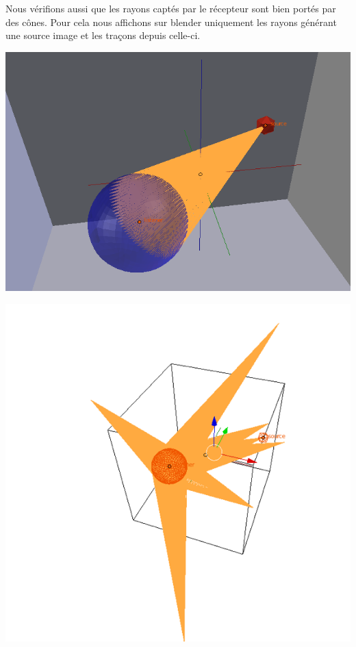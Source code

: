 Nous vérifions aussi que les rayons captés par le récepteur sont bien portés par des cônes. Pour cela nous affichons sur blender uniquement les rayons générant une source image et les traçons depuis celle-ci.

\begin{figureth}
	\begin{subfigureth}{0.45\textwidth}
		\includegraphics[width=\linewidth]{images/testBeam}
		\caption{Propagation des rayons depuis la source vers le récepteur (100000 rayons au total)}
		\label{testBeam}
	\end{subfigureth}
	\quad
	\begin{subfigureth}{0.45\textwidth}
		\includegraphics[width=\linewidth]{images/testBeam2}
		\caption{Propagation des rayons depuis les sources-images à l'ordre vers le récepteur 0 et 1  (100000 rayons au total)}
		\label{testBeam2}
	\end{subfigureth}
\end{figureth}

